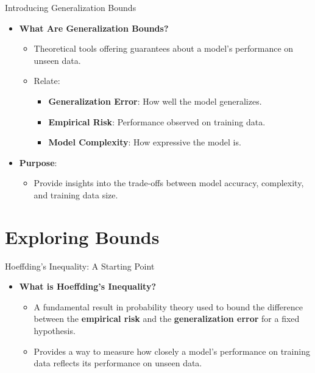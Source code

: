 \documentclass[
  ignorenonframetext,
]{beamer}
\providecommand{\tightlist}{%
  \setlength{\itemsep}{0pt}\setlength{\parskip}{0pt}}\usepackage{longtable,booktabs,array}
\begin{document}
\begin{frame}{Introducing Generalization Bounds}
\label{introducing-generalization-bounds}
\begin{itemize}
\tightlist
\item
  \textbf{What Are Generalization Bounds?}

  \begin{itemize}
  \tightlist
  \item
    Theoretical tools offering guarantees about a model's performance on
    unseen data.
  \item
    Relate:

    \begin{itemize}
    \tightlist
    \item
      \textbf{Generalization Error}: How well the model generalizes.
    \item
      \textbf{Empirical Risk}: Performance observed on training data.
    \item
      \textbf{Model Complexity}: How expressive the model is.
    \end{itemize}
  \end{itemize}
\item
  \textbf{Purpose}:

  \begin{itemize}
  \tightlist
  \item
    Provide insights into the trade-offs between model accuracy,
    complexity, and training data size.
  \end{itemize}
\end{itemize}
\end{frame}

\section{Exploring Bounds}\label{exploring-bounds}

\begin{frame}{Hoeffding's Inequality: A Starting Point}
\label{hoeffdings-inequality-a-starting-point}
\begin{itemize}
\tightlist
\item
  \textbf{What is Hoeffding's Inequality?}

  \begin{itemize}
  \tightlist
  \item
    A fundamental result in probability theory used to bound the
    difference between the \textbf{empirical risk} and the
    \textbf{generalization error} for a fixed hypothesis.
  \item
    Provides a way to measure how closely a model's performance on
    training data reflects its performance on unseen data.
  \end{itemize}
\end{itemize}
\end{frame}
\end{document}
